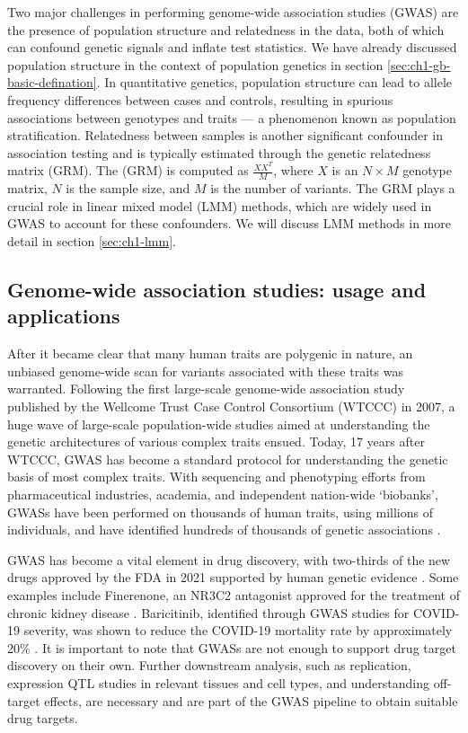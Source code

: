 Two major challenges in performing genome-wide association studies (GWAS) are the presence of population structure and relatedness in the data, both of which can confound genetic signals and inflate test statistics. We have already discussed population structure in the context of population genetics in section \ref{sec:ch1-gb-basic-defination}. In quantitative genetics, population structure can lead to allele frequency differences between cases and controls, resulting in spurious associations between genotypes and traits — a phenomenon known as population stratification. Relatedness between samples is another significant confounder in association testing and is typically estimated through the genetic relatedness matrix (GRM). The (GRM) is computed as \(\frac{XX^T}{M}\), where \(X\) is an \(N \times M\) genotype matrix, \(N\) is the sample size, and \(M\) is the number of variants. The GRM plays a crucial role in linear mixed model (LMM) methods, which are widely used in GWAS to account for these confounders. We will discuss LMM methods in more detail in section \ref{sec:ch1-lmm}.


\subsection{Genome-wide association studies: usage and applications}
\label{sec:ch1-qd-gwas-applications}

After it became clear that many human traits are polygenic in nature, an unbiased genome-wide scan for variants associated with these traits was warranted. Following the first large-scale genome-wide association study published by the Wellcome Trust Case Control Consortium (WTCCC) in 2007, a huge wave of large-scale population-wide studies aimed at understanding the genetic architectures of various complex traits ensued. Today, 17 years after WTCCC, GWAS has become a standard protocol for understanding the genetic basis of most complex traits. With sequencing and phenotyping efforts from pharmaceutical industries, academia, and independent nation-wide `biobanks', GWASs have been performed on thousands of human traits, using millions of individuals, and have identified hundreds of thousands of genetic associations \cite{GWASCatalog}. %

GWAS has become a vital element in drug discovery, with two-thirds of the new drugs approved by the FDA in 2021 supported by human genetic evidence \cite{rusina2023genetic,ochoa2022human,abdellaoui202315}. Some examples include Finerenone, an NR3C2 antagonist approved for the treatment of chronic kidney disease \cite{teumer2019genome,bakris2020effect}. Baricitinib, identified through GWAS studies for COVID-19 severity, was shown to reduce the COVID-19 mortality rate by approximately 20\% \cite{favalli2020baricitinib,horowitz2022genome}. It is important to note that GWASs are not enough to support drug target discovery on their own. Further downstream analysis, such as replication, expression QTL studies in relevant tissues and cell types, and understanding off-target effects, are necessary and are part of the GWAS pipeline to obtain suitable drug targets.

